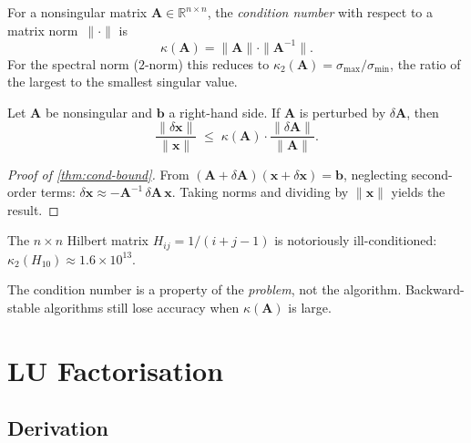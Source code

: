 \documentclass[
    language=english,
    doctype=lecture-notes,
    institution=none,
]{../../omnilatex}
\begin{document}
\begin{definition}\label{def:condition}
For a nonsingular matrix $\mathbf{A} \in \mathbb{R}^{n \times n}$, the
\emph{condition number} with respect to a matrix norm~$\|\cdot\|$ is
\[
    \kappa(\mathbf{A}) = \|\mathbf{A}\| \cdot \|\mathbf{A}^{-1}\|.
\]
For the spectral norm ($2$-norm) this reduces to
$\kappa_2(\mathbf{A}) = \sigma_{\max} / \sigma_{\min}$, the ratio of the
largest to the smallest singular value.
\end{definition}

\begin{theorem}\label{thm:cond-bound}
Let $\mathbf{A}$ be nonsingular and $\mathbf{b}$ a right-hand side. If
$\mathbf{A}$ is perturbed by $\delta\mathbf{A}$, then
\[
    \frac{\|\delta\mathbf{x}\|}{\|\mathbf{x}\|}
    \;\le\; \kappa(\mathbf{A})
           \cdot \frac{\|\delta\mathbf{A}\|}{\|\mathbf{A}\|}.
\]
\end{theorem}

\begin{proof}[Proof of \autoref{thm:cond-bound}]
From $(\mathbf{A} + \delta\mathbf{A})(\mathbf{x} + \delta\mathbf{x}) =
\mathbf{b}$, neglecting second-order terms:
$\delta\mathbf{x} \approx -\mathbf{A}^{-1}\,\delta\mathbf{A}\,\mathbf{x}$.
Taking norms and dividing by $\|\mathbf{x}\|$ yields the result.
\end{proof}

\begin{example}\label{ex:cond-hilbert}
The $n \times n$ Hilbert matrix $H_{ij} = 1/(i+j-1)$ is notoriously
ill-conditioned: $\kappa_2(H_{10}) \approx 1.6 \times 10^{13}$.
\end{example}

\begin{remark}
The condition number is a property of the \emph{problem}, not the algorithm.
Backward-stable algorithms still lose accuracy when $\kappa(\mathbf{A})$ is large.
\end{remark}

\section{LU Factorisation}

\subsection{Derivation}
\end{document}
